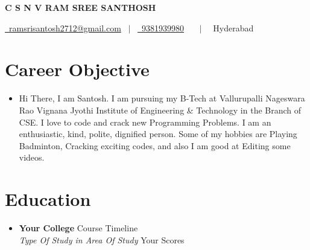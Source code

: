 \documentclass[letterpaper,5pt]{article}
\begin{document}
    
    \begin{center}
      \textbf{\Huge \scshape C S N V RAM SREE SANTHOSH} \\ \vspace{5pt}
      
      \href{mailto:ramsrisantosh2712@gmail.com}{\raisebox{-0.05\height}\faEnvelope \ ramsrisantosh2712@gmail.com} 
      \ $|$ \ \href{tel:9381939980}{\raisebox{-0.05\height}\faMobile \ 9381939980}  \
       \
      \ $|$ \ {\raisebox{-0.05\height}\faMapMarker \ Hyderabad} \ \
    \end{center}
    
      \section{Career Objective}
        \begin{itemize}[leftmargin=0.15in, label={}]
          \item{Hi There, I am Santosh. I am pursuing my B-Tech at Vallurupalli Nageswara Rao Vignana Jyothi Institute of Engineering & Technology in the Branch of CSE. I love to code and crack new Programming Problems. I am an enthusiastic, kind, polite, dignified person. Some of my hobbies are Playing Badminton, Cracking exciting codes, and also I am good at Editing some videos.}
        \end{itemize}
    
    \section{Education}
      
        \begin{itemize}
        \item
            \textbf{Your College} \hfill Course Timeline \\
            \textit{Type Of Study in Area Of Study} \hfill Your Scores
        \end{itemize}
      
      

    
    
\end{document}
